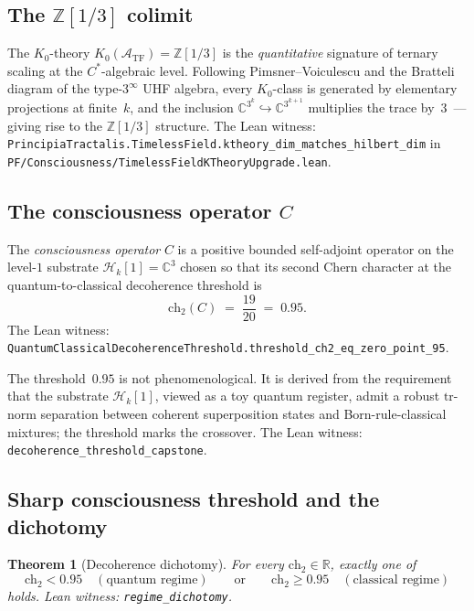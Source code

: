 \documentclass[11pt,a4paper]{article}
\newtheorem{theorem}{Theorem}[section]
\theoremstyle{definition}
\theoremstyle{remark}
\newcommand{\reals}{\mathbb{R}}
\newcommand{\complexes}{\mathbb{C}}
\newcommand{\integers}{\mathbb{Z}}
\newcommand{\HilbertK}{\mathcal{H}_{k}}
\newcommand{\TF}{\mathcal{A}_{\mathrm{TF}}}
\newcommand{\chtwo}{\mathrm{ch}_{2}}
\newcommand{\lean}[1]{\texttt{\small #1}}
\begin{document}
\subsection{The $\integers[1/3]$ colimit}

The $K_{0}$-theory $K_{0}(\TF) = \integers[1/3]$ is the
\emph{quantitative} signature of ternary scaling at the
$C^{*}$-algebraic level. Following Pimsner--Voiculescu and the
Bratteli diagram of the type-$3^{\infty}$ UHF algebra, every
$K_{0}$-class is generated by elementary projections at
finite~$k$, and the inclusion
$\complexes^{3^{k}} \hookrightarrow \complexes^{3^{k+1}}$
multiplies the trace by~$3$~--- giving rise to the
$\integers[1/3]$ structure. The Lean witness:
\lean{PrincipiaTractalis.TimelessField.ktheory\_dim\_matches\_hilbert\_dim} in
\lean{PF/Consciousness/TimelessFieldKTheoryUpgrade.lean}.

\subsection{The consciousness operator $C$}

The \emph{consciousness operator} $C$ is a positive bounded
self-adjoint operator on the level-$1$ substrate $\HilbertK[1]
= \complexes^{3}$ chosen so that its second Chern character at the
quantum-to-classical decoherence threshold is
\[
  \chtwo(C) \;=\; \frac{19}{20} \;=\; 0.95.
\]
The Lean witness:
\lean{QuantumClassicalDecoherenceThreshold.threshold\_ch2\_eq\_zero\_point\_95}.

The threshold~$0.95$ is not phenomenological. It is derived from
the requirement that the substrate $\HilbertK[1]$, viewed as a
toy quantum register, admit a robust $\mathrm{tr}$-norm
separation between coherent superposition states and Born-rule-classical
mixtures; the threshold marks the crossover. The Lean witness:
\lean{decoherence\_threshold\_capstone}.

\subsection{Sharp consciousness threshold and the dichotomy}

\begin{theorem}[Decoherence dichotomy]\label{thm:dichotomy}
For every $\chtwo \in \reals$, exactly one of
\[
  \chtwo < 0.95 \quad(\text{quantum regime}) \qquad\text{or}\qquad
  \chtwo \ge 0.95 \quad(\text{classical regime})
\]
holds. Lean witness:
\lean{regime\_dichotomy}.
\end{theorem}
\end{document}
